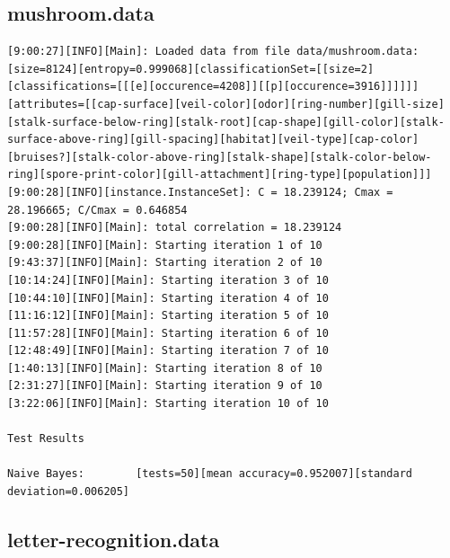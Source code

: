 \documentclass[10pt]{report}
\begin{document}
\subsection*{mushroom.data}
{\small
\begin{verbatim}
[9:00:27][INFO][Main]: Loaded data from file data/mushroom.data: [size=8124][entropy=0.999068][classificationSet=[[size=2][classifications=[[[e][occurence=4208]][[p][occurence=3916]]]]]][attributes=[[cap-surface][veil-color][odor][ring-number][gill-size][stalk-surface-below-ring][stalk-root][cap-shape][gill-color][stalk-surface-above-ring][gill-spacing][habitat][veil-type][cap-color][bruises?][stalk-color-above-ring][stalk-shape][stalk-color-below-ring][spore-print-color][gill-attachment][ring-type][population]]] 
[9:00:28][INFO][instance.InstanceSet]: C = 18.239124; Cmax = 28.196665; C/Cmax = 0.646854 
[9:00:28][INFO][Main]: total correlation = 18.239124 
[9:00:28][INFO][Main]: Starting iteration 1 of 10 
[9:43:37][INFO][Main]: Starting iteration 2 of 10 
[10:14:24][INFO][Main]: Starting iteration 3 of 10 
[10:44:10][INFO][Main]: Starting iteration 4 of 10 
[11:16:12][INFO][Main]: Starting iteration 5 of 10 
[11:57:28][INFO][Main]: Starting iteration 6 of 10 
[12:48:49][INFO][Main]: Starting iteration 7 of 10 
[1:40:13][INFO][Main]: Starting iteration 8 of 10 
[2:31:27][INFO][Main]: Starting iteration 9 of 10 
[3:22:06][INFO][Main]: Starting iteration 10 of 10 

Test Results

Naive Bayes:		[tests=50][mean accuracy=0.952007][standard deviation=0.006205] 
\end{verbatim}
}


\subsection*{letter-recognition.data}
{\small
\begin{verbatim}

\end{verbatim}
}
\end{document}
